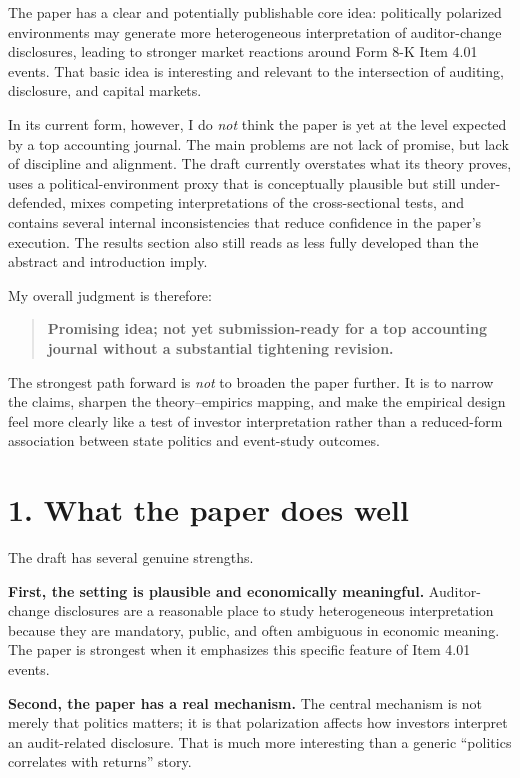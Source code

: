 The paper has a clear and potentially publishable core idea: politically polarized environments may generate more heterogeneous interpretation of auditor-change disclosures, leading to stronger market reactions around Form 8-K Item 4.01 events. That basic idea is interesting and relevant to the intersection of auditing, disclosure, and capital markets.

In its current form, however, I do \emph{not} think the paper is yet at the level expected by a top accounting journal. The main problems are not lack of promise, but lack of discipline and alignment. The draft currently overstates what its theory proves, uses a political-environment proxy that is conceptually plausible but still under-defended, mixes competing interpretations of the cross-sectional tests, and contains several internal inconsistencies that reduce confidence in the paper's execution. The results section also still reads as less fully developed than the abstract and introduction imply.

My overall judgment is therefore:

\begin{quote}
\textbf{Promising idea; not yet submission-ready for a top accounting journal without a substantial tightening revision.}
\end{quote}

The strongest path forward is \emph{not} to broaden the paper further. It is to narrow the claims, sharpen the theory--empirics mapping, and make the empirical design feel more clearly like a test of investor interpretation rather than a reduced-form association between state politics and event-study outcomes.

\section*{1. What the paper does well}

The draft has several genuine strengths.

\textbf{First, the setting is plausible and economically meaningful.} Auditor-change disclosures are a reasonable place to study heterogeneous interpretation because they are mandatory, public, and often ambiguous in economic meaning. The paper is strongest when it emphasizes this specific feature of Item 4.01 events.

\textbf{Second, the paper has a real mechanism.} The central mechanism is not merely that politics matters; it is that polarization affects how investors interpret an audit-related disclosure. That is much more interesting than a generic ``politics correlates with returns'' story.

